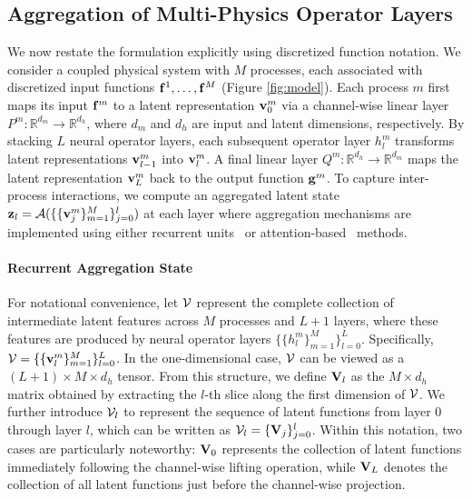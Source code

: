 \subsection{Aggregation of Multi-Physics Operator Layers}
We now restate the formulation explicitly using discretized function notation.  We consider a coupled physical system with $M$ processes, each associated with discretized input functions ${\bf f}^1, \dots, {\bf f}^M$ (Figure \ref{fig:model}). Each process $m$ first maps its input ${\bf f}^m$ to a latent representation ${\bf v}_0^m$ via a channel-wise linear layer $P^m: \mathbb{R}^{d_m}\rightarrow\mathbb{R}^{d_h}$, where $d_m$ and $d_h$ are input and latent dimensions, respectively. By stacking $L$ neural operator layers, each subsequent operator layer $h_l^m$ transforms latent representations ${\bf v}_{l-1}^m$ into ${\bf v}_l^m$. A final linear layer $Q^m: \mathbb{R}^{d_h}\rightarrow\mathbb{R}^{d_m}$ maps the latent representation ${\bf v}_L^m$ back to the output function ${\bf g}^m$. To capture inter-process interactions, we compute an aggregated latent state ${\bf z}_l=\mathcal{A}(\{\{{\bf v}^m_j\}_{m=1}^M\}_{j=0}^l)$ at each layer where aggregation mechanisms are implemented using either recurrent units~\citep{cho2014learning} or attention-based~\citep{vaswani2017attention} methods.
\paragraph{Recurrent Aggregation State} For notational convenience, let $\mathcal{V}$ represent the complete collection of intermediate latent features across $M$ processes and $L+1$ layers, where these features are produced by neural operator layers $\{\{h_l^m\}_{m=1}^M\}_{l=0}^L$. Specifically, $\mathcal{V} = \{\{{\bf v}^m_l\}_{m=1}^M\}_{l=0}^L$. In the one-dimensional case, $\mathcal{V}$ can be viewed as a $(L+1)\times M \times d_h$ tensor. From this structure, we define ${\bf V}_l$ as the $M \times d_h$ matrix obtained by extracting the $l$-th slice along the first dimension of $\mathcal{V}$. We further introduce $\mathcal{V}_{l}$ to represent the sequence of latent functions from layer $0$ through layer $l$, which can be written as $\mathcal{V}_{l} = \{{\bf V}_j\}_{j=0}^{l}$. Within this notation, two cases are particularly noteworthy: ${\bf V}_0$ represents the collection of latent functions immediately following the channel-wise lifting operation, while ${\bf V}_L$ denotes the collection of all latent functions just before the channel-wise projection.

